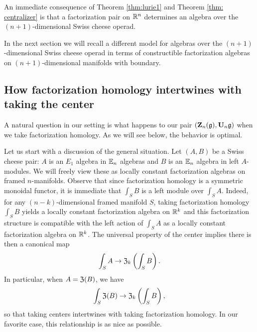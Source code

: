 \documentclass[11pt]{amsart}
\numberwithin{equation}{section}
\begin{document}
An immediate consequence of Theorem \ref{thm:lurie1} and Theorem \ref{thm: centralizer} is that a factorization pair on $\mathbb R^n$ determines an algebra over the $(n+1)$-dimensional Swiss cheese operad. 

In the next section we will recall a different model for algebras over the $(n+1)$-dimensional Swiss cheese operad in terms of constructible factorization algebras on $(n+1)$-dimensional manifolds with boundary. 

%
%

\subsection{How factorization homology intertwines with taking the center}

A natural question in our setting is what happens to our pair $(\mathbf Z_n(\mathfrak g), \mathbf U_n \mathfrak g)$ when we take factorization homology.
As we will see below, the behavior is optimal.

Let us start with a discussion of the general situation.
Let $(A,B)$ be a Swiss cheese pair: $A$ is an $E_1$ algebra in $\mathbb E_n$ algebras and $B$ is an $\mathbb E_n$ algebra in left $A$-modules. 
We will freely view these as locally constant factorization algebras on framed $n$-manifolds.
Observe that since factorization homology is a symmetric monoidal functor, 
it is immediate that $\int_S B$ is a left module over $\int_S A$.
Indeed, for any $(n-k)$-dimensional framed manifold $S$, 
taking factorization homology $\int_S B$ yields a locally constant factorization algebra on $\mathbb R^k$ 
and this factorization structure is compatible with the left action of $\int_S A$ as a locally constant factorization algebra on $\mathbb R^k$.
The universal property of the center implies there is then a canonical map
\[
\int_{S} A \to \mathfrak Z_k \left( \int_S B \right).
\]
In particular, when $A = \mathfrak Z(B)$, we have
\begin{equation}
\label{eqn: can cen int}
\int_{S} \mathfrak Z(B) \to \mathfrak Z_k \left( \int_S B \right),
\end{equation}
so that taking centers intertwines with taking factorization homology.
In our favorite case, this relationship is as nice as possible.
\end{document}
